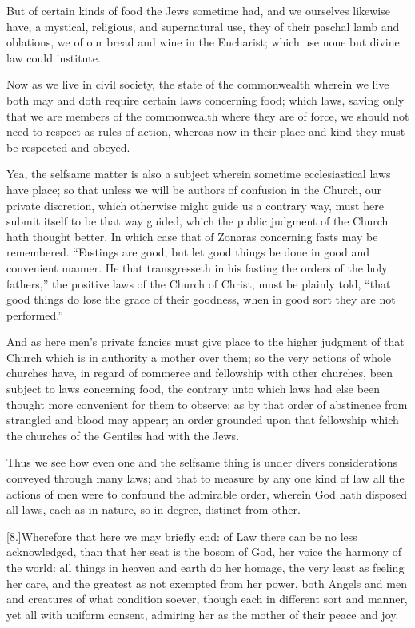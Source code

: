 But of certain kinds of food the Jews sometime had, and we ourselves likewise have, a mystical, religious, and supernatural use, they of their paschal lamb and oblations, we of our bread and wine in the Eucharist; which use none but divine law could institute.

Now as we live in civil society, the state of the commonwealth wherein we live both may and doth require certain laws concerning food; which laws, saving only that we are members of the commonwealth where they are of force, we should not need to respect as rules of action, whereas now in their place and kind they must be respected and obeyed.

Yea, the selfsame matter is also a subject wherein sometime ecclesiastical laws have place; so that unless we will be  authors of confusion in the Church, our private discretion, which otherwise might guide us a contrary way, must here submit itself to be that way guided, which the public judgment of the Church hath thought better. In which case that of Zonaras concerning fasts may be remembered. “Fastings are good, but let good things be done in good and convenient manner. He that transgresseth in his fasting the orders of the holy fathers,” the positive laws of the Church of Christ, must be plainly told, “that good things do lose the grace of their goodness, when in good sort they are not performed.”

And as here men’s private fancies must give place to the higher judgment of that Church which is in authority a mother over them; so the very actions of whole churches have, in regard of commerce and fellowship with other churches, been subject to laws concerning food, the contrary unto which laws had else been thought more convenient for them to observe; as by that order of abstinence from strangled and blood may appear; an order grounded upon that fellowship which the churches of the Gentiles had with the Jews.

Thus we see how even one and the selfsame thing is under divers considerations conveyed through many laws; and that to measure by any one kind of law all the actions of men were to confound the admirable order, wherein God hath disposed all laws, each as in nature, so in degree, distinct from other.

[8.]Wherefore that here we may briefly end: of Law there can be no less acknowledged, than that her seat is the bosom of God, her voice the harmony of the world: all things in heaven and earth do her homage, the very least as feeling her care, and the greatest as not exempted from her power, both Angels and men and creatures of what condition soever, though each in different sort and manner, yet all with uniform consent, admiring her as the mother of their peace and joy.
